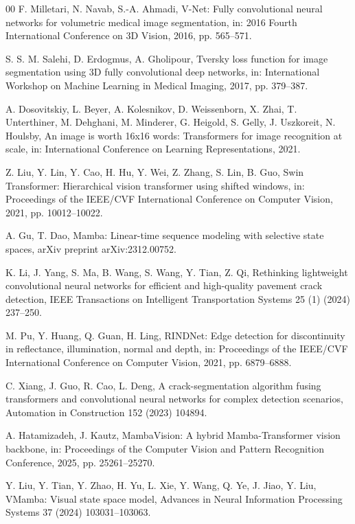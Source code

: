 \documentclass[preprint,12pt]{elsarticle}
\begin{document}
\begin{thebibliography}{00}
F. Milletari, N. Navab, S.-A. Ahmadi,
V-Net: Fully convolutional neural networks for volumetric medical image segmentation,
in: 2016 Fourth International Conference on 3D Vision, 2016, pp. 565--571.

S. S. M. Salehi, D. Erdogmus, A. Gholipour,
Tversky loss function for image segmentation using 3D fully convolutional deep networks,
in: International Workshop on Machine Learning in Medical Imaging, 2017, pp. 379--387.

A. Dosovitskiy, L. Beyer, A. Kolesnikov, D. Weissenborn, X. Zhai, T. Unterthiner, M. Dehghani, M. Minderer, G. Heigold, S. Gelly, J. Uszkoreit, N. Houlsby,
An image is worth 16x16 words: Transformers for image recognition at scale,
in: International Conference on Learning Representations, 2021.

Z. Liu, Y. Lin, Y. Cao, H. Hu, Y. Wei, Z. Zhang, S. Lin, B. Guo,
Swin Transformer: Hierarchical vision transformer using shifted windows,
in: Proceedings of the IEEE/CVF International Conference on Computer Vision, 2021, pp. 10012--10022.

A. Gu, T. Dao,
Mamba: Linear-time sequence modeling with selective state spaces,
arXiv preprint arXiv:2312.00752.

K. Li, J. Yang, S. Ma, B. Wang, S. Wang, Y. Tian, Z. Qi,
Rethinking lightweight convolutional neural networks for efficient and high-quality pavement crack detection,
IEEE Transactions on Intelligent Transportation Systems 25 (1) (2024) 237--250.

M. Pu, Y. Huang, Q. Guan, H. Ling,
RINDNet: Edge detection for discontinuity in reflectance, illumination, normal and depth,
in: Proceedings of the IEEE/CVF International Conference on Computer Vision, 2021, pp. 6879--6888.

C. Xiang, J. Guo, R. Cao, L. Deng,
A crack-segmentation algorithm fusing transformers and convolutional neural networks for complex detection scenarios,
Automation in Construction 152 (2023) 104894.

A. Hatamizadeh, J. Kautz,
MambaVision: A hybrid Mamba-Transformer vision backbone,
in: Proceedings of the Computer Vision and Pattern Recognition Conference, 2025, pp. 25261--25270.

Y. Liu, Y. Tian, Y. Zhao, H. Yu, L. Xie, Y. Wang, Q. Ye, J. Jiao, Y. Liu,
VMamba: Visual state space model,
Advances in Neural Information Processing Systems 37 (2024) 103031--103063.


\end{thebibliography}
\end{document}
